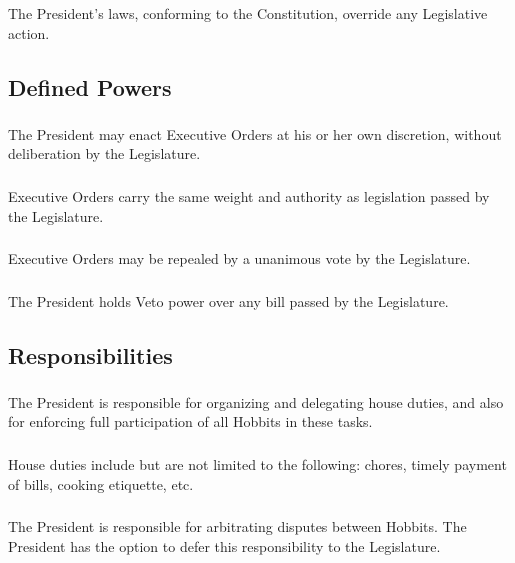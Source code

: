 \documentclass[]{article}
\begin{document}
\subsubsection{}
The President’s laws, conforming to the Constitution, override any Legislative action.
\subsection{Defined Powers}
\subsubsection{}
The President may enact Executive Orders at his or her own discretion, without deliberation by the Legislature.
\subsubsection{}
Executive Orders carry the same weight and authority as legislation passed by the Legislature. 
\subsubsection{}
Executive Orders may be repealed by a unanimous vote by the Legislature.
\subsubsection{}
The President holds Veto power over any bill passed by the Legislature. 
\subsection{Responsibilities}
\subsubsection{}
The President is responsible for organizing and delegating house duties, and also for enforcing full participation of all Hobbits in these tasks.
\subsubsection{}
House duties include but are not limited to the following: chores, timely payment of bills, cooking etiquette, etc.
\subsubsection{}
The President is responsible for arbitrating disputes between Hobbits. The President has the option to defer this responsibility to the Legislature.
\end{document}
